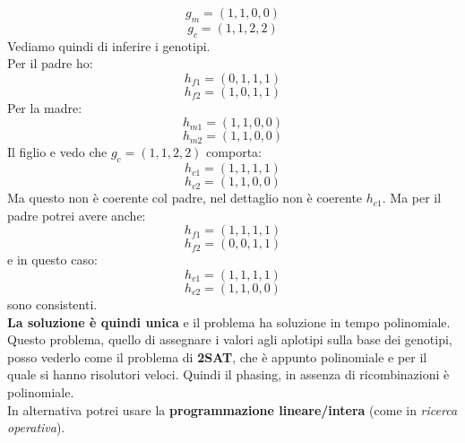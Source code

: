 \documentclass[a4paper,12pt, oneside]{book}
\begin{document}
\begin{esempio}
  \[g_m=(1,1,0,0)\]
  \[g_c=(1,1,2,2)\]
  Vediamo quindi di inferire i genotipi.\\
  Per il padre ho:
  \[h_{f1}=(0,1,1,1)\]
  \[h_{f2}=(1,0,1,1)\]
  Per la madre:
  \[h_{m1}=(1,1,0,0)\]
  \[h_{m2}=(1,1,0,0)\]
  Il figlio e vedo che $g_c=(1,1,2,2)$ comporta:
  \[h_{c1}=(1,1,1,1)\]
  \[h_{c2}=(1,1,0,0)\]
  Ma questo non è coerente col padre, nel dettaglio non è coerente $h_{c1}$. Ma
  per il padre potrei avere anche:
  \[h_{f1}=(1,1,1,1)\]
  \[h_{f2}=(0,0,1,1)\]
  e in questo caso:
  \[h_{c1}=(1,1,1,1)\]
  \[h_{c2}=(1,1,0,0)\]
  sono consistenti.\\
  \textbf{La soluzione è quindi unica} e il problema ha soluzione in tempo
  polinomiale. Questo problema, quello di assegnare i valori agli aplotipi sulla
  base dei genotipi, posso vederlo come il problema di \textbf{2SAT}, che è
  appunto polinomiale e per il quale si hanno risolutori veloci. Quindi il
  phasing, in assenza di ricombinazioni è polinomiale. \\
  In alternativa potrei usare la \textbf{programmazione lineare/intera} (come in
  \textit{ricerca operativa}).
\end{esempio}
\newpage
\end{document}
